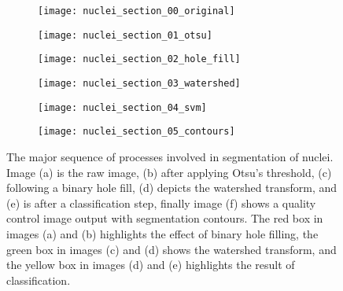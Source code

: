 \begin{figure}[htbp]\centering
	\begin{subfigure}[b]{0.25\linewidth} %
		\centering
		\texttt{[image: nuclei\_section\_00\_original]}
		\caption{}
		\label{figure:image_processing:nuclei_segmentation:00}
		\vspace{1ex}
	\end{subfigure}
	\begin{subfigure}[b]{0.25\linewidth} %
		\centering
		\texttt{[image: nuclei\_section\_01\_otsu]}
		\caption{}
		\label{figure:image_processing:nuclei_segmentation:01}
		\vspace{1ex}
	\end{subfigure}
	\begin{subfigure}[b]{0.25\linewidth} %
		\centering
		\texttt{[image: nuclei\_section\_02\_hole\_fill]}
		\caption{}
		\label{figure:image_processing:nuclei_segmentation:02}
		\vspace{1ex}
	\end{subfigure}
	\begin{subfigure}[b]{0.25\linewidth} %
		\centering
		\texttt{[image: nuclei\_section\_03\_watershed]}
		\caption{}
		\label{figure:image_processing:nuclei_segmentation:03}
		\vspace{1ex}
	\end{subfigure}
	\begin{subfigure}[b]{0.25\linewidth} %
		\centering
		\texttt{[image: nuclei\_section\_04\_svm]}
		\caption{}
		\label{figure:image_processing:nuclei_segmentation:04}
		\vspace{1ex}
	\end{subfigure}
	\begin{subfigure}[b]{0.25\linewidth} %
		\centering
		\texttt{[image: nuclei\_section\_05\_contours]}
		\caption{}
		\label{figure:image_processing:nuclei_segmentation:05}
		\vspace{1ex}
	\end{subfigure}
\caption[Nuclei segmentation]{The major sequence of processes involved in segmentation of nuclei. Image (a) is the raw image, (b) after applying Otsu's threshold, (c) following a binary hole fill, (d) depicts the watershed transform, and (e) is after a classification step, finally image (f) shows a quality control image output with segmentation contours. The red box in images (a) and (b) highlights the effect of binary hole filling, the green box in images (c) and (d) shows the watershed transform, and the yellow box in images (d) and (e) highlights the result of classification.}
\label{figure:image_processing:nuclei_segmentation}
\end{figure}


